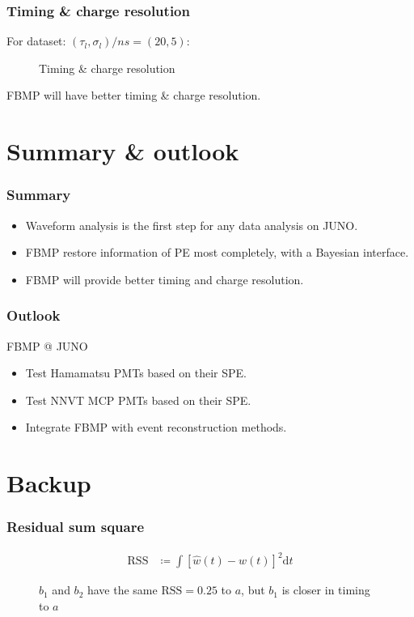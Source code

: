 \documentclass{beamer}
\begin{document}
\begin{CJK*}{UTF8}{gbsn}
\begin{frame}
\frametitle{Timing \& charge resolution}
For dataset: $(\tau_l, \sigma_l)/\si{ns}=(20, 5)$:
\begin{figure}
    \centering
    \resizebox{\textwidth}{!}{}
    \caption{Timing \& charge resolution}
\end{figure}
\begin{block}{}
FBMP will have better timing \& charge resolution. 
\end{block}
\end{frame}

\section{Summary \& outlook}

\begin{frame}
\frametitle{Summary}
\begin{itemize}
    \item Waveform analysis is the first step for any data analysis on JUNO. 
    \item FBMP restore information of PE most completely, with a Bayesian interface. 
    \item FBMP will provide better timing and charge resolution. 
\end{itemize}
\end{frame}

\begin{frame}
\frametitle{Outlook}
FBMP @ JUNO
\begin{itemize}
    \item Test Hamamatsu PMTs based on their SPE. 
    \item Test NNVT MCP PMTs based on their SPE. 
    \item Integrate FBMP with event reconstruction methods. 
\end{itemize}
\end{frame}

\section{Backup}

\begin{frame}
\frametitle{Residual sum square}
\begin{align*}
  \mathrm{RSS} &\coloneqq \int\left[\hat{w}(t) - w(t)\right]^2\mathrm{d}t
\end{align*}
\begin{figure}
    \centering
    \resizebox{1.0\textwidth}{!}{}
    \caption{$b_1$ and $b_2$ have the same $\mathrm{RSS}=0.25$ to $a$, but $b_1$ is closer in timing to $a$}
\end{figure}
\end{frame}


\end{CJK*}
\end{document}
